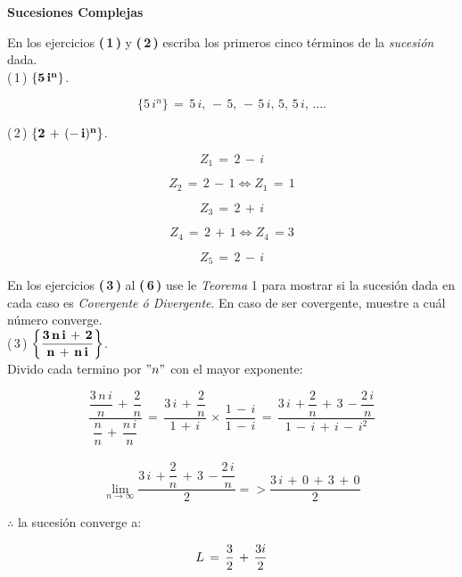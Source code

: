 \documentclass[a4paper,11pt,openany]{book}
\begin{document}
\newpage




\begin{center}
\textbf{Sucesiones Complejas}
\end{center}

En los ejercicios \textbf{(\,1\,)} y \textbf{(\,2\,)} escriba los primeros cinco términos de la {\it sucesión} dada.\\

\textcolor{ao(english)}{(\,1\,)} $\bf{\{5\,i^{n}\}}$.

$$\{5\,i^{n}\}\,=\,5\,i,\,-\,5,\,-\,5\,i,\,5,\,5\,i,\,....$$

\textcolor{ao(english)}{(\,2\,)} $\bf{\{2\,+\,(-\,i)^{n}\}}$.

$$ Z_{1}\,=\,2\,-\,i $$

$$ Z_{2}\,=\,2\,-\,1 \iff Z_{1}\,=\,1  $$

$$ Z_{3}\,=\,2\,+\,i $$

$$ Z_{4}\,=\,2\,+\,1 \iff Z_{4}\,= 3$$

$$ Z_{5}\,=\,2\,-\,i $$

En los ejercicios \textbf{(\,3\,)} al \textbf{(\,6\,)} use le \textcolor{mediumviolet-red}{{\it Teorema} 1} para mostrar si la sucesión dada en cada caso es {\it Covergente ó Divergente}. En caso de ser covergente, muestre a cuál número converge.\\

\textcolor{ao(english)}{(\,3\,)} $\bf{\left\{\dfrac{3\,n\,i\,+\,2}{n\,+\,n\,i}\right\}}$.\\

 Divido cada termino por $"n"$ con el mayor exponente:

 $$\dfrac{\dfrac{3\,n\,i}{n}\,+\,\dfrac{2}{n}}{\dfrac{n}{n}\,+\,\dfrac{n\,i}{n}}\,=\,\dfrac{3\,i\,+\,\dfrac{2}{n}}{1\,+\,i}\,\times\,\dfrac{1\,-\,i}{1\,-\,i}\,=\,\dfrac{3\,i\,+\dfrac{2}{n}\,+\,3\,-\dfrac{2\,i}{n}}{1\,-\,i\,+\,i\,-\,i^{2}}$$\\

$$\displaystyle\lim_{n \to \infty} \dfrac{3\,i\,+\dfrac{2}{n}\,+\,3\,-\dfrac{2\,i}{n}}{2} => \dfrac{3\,i\,+\,0\,+\,3\,+\,0}{2} $$

$\therefore$ la sucesión converge a:

$$\mathnormal{L}\,=\,\dfrac{3}{2}\,+\,\dfrac{3i}{2}$$
\end{document}

